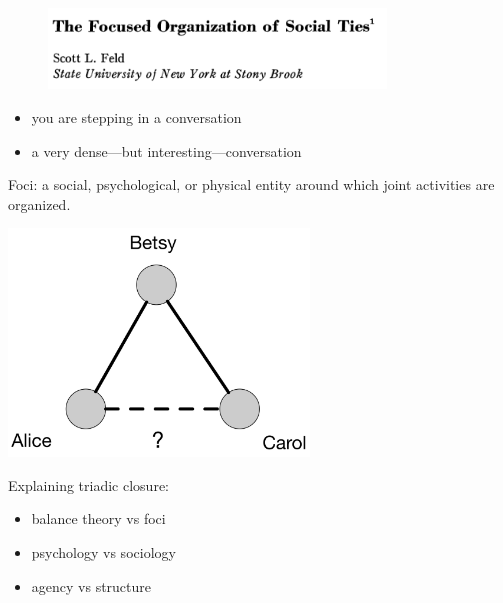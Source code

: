 \documentclass[aspectratio=169]{beamer}
\begin{document}
\begin{frame}

\begin{figure}
  \centering
  \includegraphics[width=0.8\textwidth]{figures/feld_focused_1981_title}
\end{figure}

\pause

\begin{itemize}
\item you are stepping in a conversation
\pause
\item a very dense---but interesting---conversation
\end{itemize}

\end{frame}
\begin{frame}

Foci: a social, psychological, or physical entity around which joint activities are organized. 

\end{frame}
\begin{frame}

\begin{center}
 \includegraphics[width=0.6\textwidth]{figures/triadic_closure}
\end{center}

Explaining triadic closure:
\begin{itemize}
\item balance theory vs foci
\item psychology vs sociology
\item agency vs structure
\end{itemize}


\end{frame}
\end{document}
